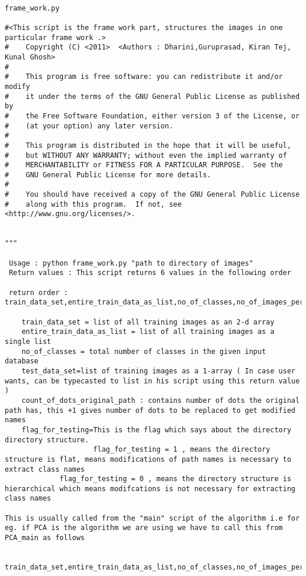 \documentclass[10pt,a4paper]{article}
\begin{document}
\newpage

\begin{lstlisting}

frame_work.py

#<This script is the frame work part, structures the images in one particular frame work .>
#    Copyright (C) <2011>  <Authors : Dharini,Guruprasad, Kiran Tej, Kunal Ghosh>
#
#    This program is free software: you can redistribute it and/or modify
#    it under the terms of the GNU General Public License as published by
#    the Free Software Foundation, either version 3 of the License, or
#    (at your option) any later version.
#
#    This program is distributed in the hope that it will be useful,
#    but WITHOUT ANY WARRANTY; without even the implied warranty of
#    MERCHANTABILITY or FITNESS FOR A PARTICULAR PURPOSE.  See the
#    GNU General Public License for more details.
#
#    You should have received a copy of the GNU General Public License
#    along with this program.  If not, see <http://www.gnu.org/licenses/>.


"""

 Usage : python frame_work.py "path to directory of images"
 Return values : This script returns 6 values in the following order 
 
 return order : train_data_set,entire_train_data_as_list,no_of_classes,no_of_images_per_class,test_data_set,flag_for_testing
	
	train_data_set = list of all training images as an 2-d array
	entire_train_data_as_list = list of all training images as a single list
	no_of_classes = total number of classes in the given input database
	test_data_set=list of training images as a 1-array ( In case user wants, can be typecasted to list in his script using this return value )
	count_of_dots_original_path : contains number of dots the original path has, this +1 gives number of dots to be replaced to get modified names
	flag_for_testing=This is the flag which says about the directory directory structure. 
	                 flag_for_testing = 1 , means the directory structure is flat, means modifications of path names is necessary to extract class names
  			 flag_for_testing = 0 , means the directory structure is hierarchical which means modifcations is not necessary for extracting class names

This is usually called from the "main" script of the algorithm i.e for eg. if PCA is the algorithm we are using we have to call this from PCA_main as follows 

	 train_data_set,entire_train_data_as_list,no_of_classes,no_of_images_per_class,test_data_set,flag_for_testing=frame_work.pre_process(images_path)
 	

\end{lstlisting}
\end{document}
